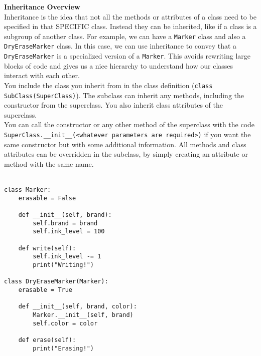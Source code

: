 \textbf{Inheritance Overview} \\
Inheritance is the idea that not all the methods or attributes of a class need to be specified in that SPECIFIC class. Instead they can be inherited, like if a class is a subgroup of another class.
For example, we can have a \lstinline{Marker} class and also a \lstinline{DryEraseMarker} class. In this case, we can use inheritance to convey that a \lstinline{DryEraseMarker} is a specialized version of a \lstinline{Marker}.
This avoids rewriting large blocks of code and gives us a nice hierarchy to understand how our classes interact with each other. \\

You include the class you inherit from in the class definition (\lstinline{class SubClass(SuperClass)}). The subclass can inherit any methods, including the constructor from the superclass. You also inherit class attributes of the superclass. \\
You can call the constructor or any other method of the superclass with the code \lstinline{SuperClass.__init__(<whatever parameters are required>)} if you want the same constructor but with some additional information. All methods and class attributes can be overridden in the subclass, by simply creating an attribute or method with the same name. \\\\

\begin{lstlisting}
class Marker:
    erasable = False

    def __init__(self, brand):
        self.brand = brand
        self.ink_level = 100

    def write(self):
        self.ink_level -= 1
        print("Writing!")

class DryEraseMarker(Marker):
    erasable = True

    def __init__(self, brand, color):
        Marker.__init__(self, brand)
        self.color = color

    def erase(self):
        print("Erasing!")
\end{lstlisting}
